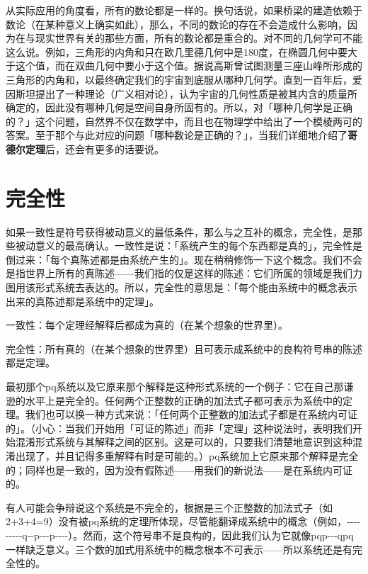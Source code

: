 \documentclass[
  12pt,
  twoside,
  openright,
  oldfontcommands,
]{memoir}
\newcommand{\heititext}[1]{{\heifamily\bfseries #1}}
\begin{document}
从实际应用的角度看，所有的数论都是一样的。换句话说，如果桥梁的建造依赖于数论（在某种意义上确实如此），那么，不同的数论的存在不会造成什么影响，因为在与现实世界有关的那些方面，所有的数论都是重合的。对不同的几何学可不能这么说。例如，三角形的内角和只在欧几里德几何中是180度，在椭圆几何中要大于这个值，而在双曲几何中要小于这个值。据说高斯曾试图测量三座山峰所形成的三角形的内角和，以最终确定我们的宇宙到底服从哪种几何学。直到一百年后，爱因斯坦提出了一种理论（广义相对论），认为宇宙的几何性质是被其内含的质量所确定的，因此没有哪种几何是空间自身所固有的。所以，对「哪种几何学是正确的？」这个问题，自然界不仅在数学中，而且也在物理学中给出了一个模棱两可的答案。至于那个与此对应的问题「哪种数论是正确的？」，当我们详细地介绍了\heititext{哥德尔定理}后，还会有更多的话要说。

\section{完全性}

如果一致性是符号获得被动意义的最低条件，那么与之互补的概念，完全性，是那些被动意义的最高确认。一致性是说：「系统产生的每个东西都是真的」，完全性是倒过来：「每个真陈述都是由系统产生的」。现在稍稍修饰一下这个概念。我们不会是指世界上所有的真陈述------我们指的仅是这样的陈述：它们所属的领域是我们力图用该形式系统去表达的。所以，完全性的意思是：「每个能由系统中的概念表示出来的真陈述都是系统中的定理」。

{一致性：每个定理经解释后都成为真的（在某个想象的世界里）。}

{完全性：所有真的（在某个想象的世界里）且可表示成系统中的良构符号串的陈述都是定理。}

最初那个pq系统以及它原来那个解释是这种形式系统的一个例子：它在自己那谦逊的水平上是完全的。任何两个正整数的正确的加法式子都可表示为系统中的定理。我们也可以换一种方式来说：「任何两个正整数的加法式子都是在系统内可证的」。{（小心：当我们开始用「可证的陈述」而非「定理」这种说法时，表明我们开始混淆形式系统与其解释之间的区别。这是可以的，只要我们清楚地意识到这种混淆出现了，并且记得多重解释有时是可能的。）}pq系统加上它原来那个解释是完全的；同样也是一致的，因为没有假陈述------用我们的新说法------是在系统内可证的。

有人可能会争辩说这个系统是不完全的，根据是三个正整数的加法式子（如2+3+4=9）没有被pq系统的定理所体现，尽管能翻译成系统中的概念（例如，-\/-\/-\/-\/-\/-\/-\/-\/-q-\/-p-\/-\/-p-\/-\/-\/-）。然而，这个符号串不是良构的，因此我们认为它就像pqp-\/-\/-qpq一样缺乏意义。三个数的加式用系统中的概念根本不可表示------所以系统还是有完全性的。
\end{document}
